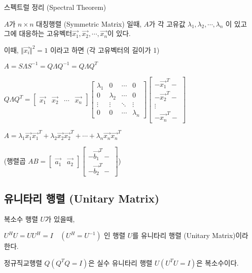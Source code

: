 \begin{theorem}
스펙트럴 정리 (Spectral Theorem)

$A$가 $n \times n$ 대칭행렬 (Symmetric Matrix) 일때, $A$가 각 고유값 $\lambda_1,\lambda_2, \cdots, \lambda_n$ 이 있고 그에 대응하는 고유벡터$ \vec{x_1}, \vec{x_2}, \cdots, \vec{x_n} $이 있다.

이때, $\Vert \vec{x_i} \Vert^2 = 1$ 이라고 하면 (각 고유벡터의 길이가 1)

$A=S\Lambda S^{-1} = Q\Lambda Q^{-1} = Q\Lambda Q^{T}$

$Q\Lambda Q^{T} = \begin{bmatrix} \vec{x_1} & \vec{x_2} & \cdots & \vec{x_n} \end{bmatrix} \begin{bmatrix} \lambda_1 & 0 & \cdots & 0 \\ 0 & \lambda_2& \cdots&0 \\ \vdots&\vdots& \ddots & \vdots \\ 0 &0&\cdots&\lambda_n  \end{bmatrix} \begin{bmatrix} -\vec{x_1}^T- \\ -\vec{x_2}^T- \\ \vdots \\ -\vec{x_n}^T- \end{bmatrix}$

$A=\lambda_1\vec{x_1}\vec{x_1}^T+\lambda_2\vec{x_2}\vec{x_2}^T+ \cdots + \lambda_n\vec{x_n}\vec{x_n}^T$
\end{theorem}



(행렬곱 $AB=\begin{bmatrix}\vec{a_1} & \vec{a_2} \end{bmatrix}\begin{bmatrix}-\vec{b_1}^T- \\ -\vec{b_2}^T- \end{bmatrix}$)



\newpage
\subsection{유니타리 행렬 (Unitary Matrix)}

\begin{definition} 
복소수 행렬 $U$가 있을때,

$U^HU = UU^H = I \quad (U^H=U^{-1})$ 인 행렬 $U$를 유니타리 행렬 (Unitary Matrix)이라 한다.

정규직교행렬 $Q (Q^TQ=I)$은 실수 유니타리 행렬 $U (U^TU=I)$은 복소수이다.

\end{definition}

